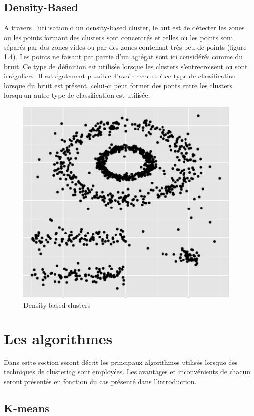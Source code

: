 \documentclass[memoire.tex]{subfiles}
\begin{document}
\newpage
\subsection{Density-Based}
A travers l'utilisation d'un density-based cluster, le but est de détecter les zones ou les points formant des clusters sont concentrés et celles ou les points sont séparés par des zones vides ou par des zones contenant très peu de points (figure 1.4). Les points ne faisant par partie d'un agrégat sont ici considérés comme du bruit. Ce type de définition est utilisée lorsque les clusters s'entrecroisent ou sont irréguliers.\cite{ref4} Il est également possible d'avoir recours à ce type de classification lorsque du bruit est présent, celui-ci peut former des ponts entre les clusters lorsqu'un autre type de classification est utilisée.
	\begin{figure}[h!]
		\centerline{\includegraphics[scale=0.8]{img/density_cluster.png}}
		\caption{Density based clusters}
	\end{figure}

\newpage
\section{Les algorithmes}
Dans cette section seront décrit les principaux algorithmes utilisés lorsque des techniques de clustering sont employées. Les avantages et inconvénients de chacun seront présentés en fonction du cas présenté dans l'introduction.
\subsection{K-means}
\end{document}

